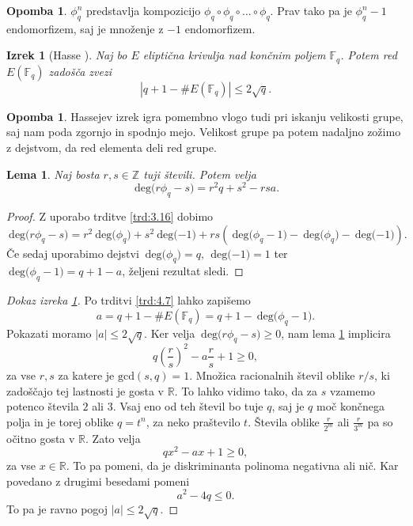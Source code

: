 \documentclass[12pt,a4paper,twoside]{article}
\theoremstyle{definition} %
\newtheorem{opomba}[definicija]{Opomba}
\theoremstyle{plain} %
\newtheorem{lema}[definicija]{Lema}
\newtheorem{izrek}[definicija]{Izrek}
\numberwithin{equation}{section}  %
\newcommand{\R}{\mathbb R}
\newcommand{\Z}{\mathbb Z}
\newcommand{\F}{\mathbb F}
\newcommand{\E}[1]{E({#1})}
\newcommand{\DEG}[1]{\ \text{deg(}{#1}\text{)}}
\begin{document}
\begin{opomba}
$\phi^n_q$ predstavlja kompozicijo $\phi_q \circ \phi_q \circ \ldots \circ \phi_q$. Prav tako pa je $\phi^n_q-1$ endomorfizem, saj je množenje z $-1$ endomorfizem.
\end{opomba}

\begin{izrek}[Hasse ]
\label{izr:Hasse}
Naj bo $E$ eliptična krivulja nad končnim poljem $\F_q$.  Potem red $\E{\F_q}$ zadošča zvezi
$$|q+1-\#\E{\F_q}| \leq 2\sqrt{q}.$$
\end{izrek}

\begin{opomba}
Hassejev izrek igra pomembno vlogo tudi pri iskanju velikosti grupe, saj nam poda zgornjo in spodnjo mejo. Velikost grupe pa potem nadaljno zožimo z dejstvom, da red elementa deli red grupe. 
\end{opomba}

\begin{lema}
\label{lema:hasse}
Naj bosta $r,s \in \Z$ tuji števili. Potem velja
$$\DEG{r\phi_q-s} = r^2q+s^2-rsa.$$
\end{lema}

\begin{proof}
Z uporabo trditve \ref{trd:3.16} dobimo
$$\DEG{r\phi_q-s} = r^2\DEG{\phi_q}+s^2\DEG{-1}+rs(\DEG{\phi_q-1}-\DEG{\phi_q}-\DEG{-1}).$$
Če sedaj uporabimo dejstvi $\DEG{\phi_q} = q,\ \DEG{-1} = 1$ ter $\DEG{\phi_q-1} = q+1-a$, željeni rezultat sledi.
\end{proof}

\begin{proof}[Dokaz izreka \ref{izr:Hasse}]
Po trditvi \ref{trd:4.7} lahko zapišemo
$$a=q+1-\#\E{\F_q} = q+1 -\DEG{\phi_q-1}.$$
Pokazati moramo $|a| \leq 2\sqrt{q}.$
Ker velja $\DEG{r\phi_q-s} \geq 0$, nam lema \ref{lema:hasse} implicira
$$q \left( \frac{r}{s} \right)^2-a\frac{r}{s}+1 \geq 0,$$
za vse $r,s$ za katere je $\text{gcd}(s,q)=1$. Množica racionalnih števil oblike $r/s$, ki zadoščajo tej lastnosti je gosta v $\R$. To lahko vidimo tako, da za $s$ vzamemo potenco števila $2$ ali $3$. Vsaj eno od teh števil bo tuje $q$, saj je $q$ moč končnega polja in je torej oblike $q = t^n$, za neko praštevilo $t$. Števila oblike $\frac{r}{2^m}$ ali $\frac{r}{3^m}$ pa so očitno gosta v $\R$. Zato velja
$$qx^2-ax + 1 \geq 0,$$
za vse $x\in \R$. To pa pomeni, da je diskriminanta polinoma negativna ali nič. Kar povedano z drugimi besedami pomeni
$$a^2-4q \leq 0.$$
To pa je ravno pogoj $|a|\leq 2\sqrt{q}$.


\end{proof}
\end{document}
